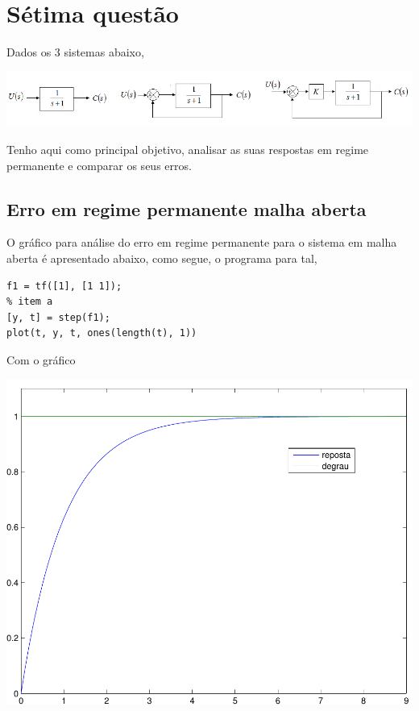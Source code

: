 \documentclass[paper=a4, fontsize=11pt]{article}
\begin{document}
\section{Sétima questão}

Dados os 3 sistemas abaixo,

\begin{center}
    \includegraphics[scale=0.5]{q7.png}
\end{center}

Tenho aqui como principal objetivo, analisar as suas respostas em regime permanente
e comparar os seus erros.

\subsection{Erro em regime permanente malha aberta}

O gráfico para análise do erro em regime permanente para o sistema em malha aberta
é apresentado abaixo, como segue, o programa para tal,

\begin{lstlisting}
f1 = tf([1], [1 1]);
% item a
[y, t] = step(f1);
plot(t, y, t, ones(length(t), 1))
\end{lstlisting}
 
Com o gráfico

\begin{center}
    \includegraphics[scale=0.5]{q7ia.pdf}
\end{center}
\end{document}
